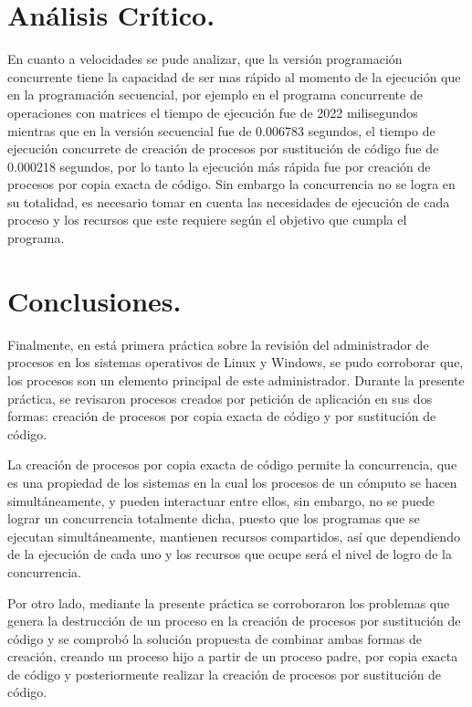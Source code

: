 \documentclass[12pt]{article}
\begin{document}
\section{Análisis Crítico.}
    
En cuanto a velocidades  se pude analizar, que la versión programación concurrente tiene la capacidad de ser mas rápido al momento de la ejecución que en la programación secuencial, por ejemplo en el programa concurrente de operaciones con matrices el tiempo de ejecución fue de 2022 milisegundos mientras que en la versión secuencial fue de 0.006783 segundos, el tiempo de ejecución concurrete de creación de procesos por sustitución de código fue de 0.000218 segundos, por lo tanto la ejecución más rápida fue por creación de procesos por copia exacta de código. Sin embargo la concurrencia no se logra en su totalidad, es necesario tomar en cuenta las necesidades de ejecución de cada proceso y los recursos que este requiere según el objetivo que cumpla el programa.

\newpage
\section{Conclusiones.}

Finalmente, en está primera práctica sobre la revisión del administrador de procesos en los sistemas operativos de Linux y Windows, se pudo corroborar que, los procesos son un elemento principal de este administrador. Durante la presente práctica, se revisaron procesos creados por petición de aplicación en sus dos formas: creación de procesos por copia exacta de código y por sustitución de código. 

La creación de procesos por copia exacta de código permite la concurrencia, que es una propiedad de los sistemas en la cual los procesos de un cómputo se hacen simultáneamente, y pueden interactuar entre ellos, sin embargo, no se puede lograr un concurrencia totalmente dicha, puesto que los programas que se ejecutan simultáneamente, mantienen recursos compartidos, así que dependiendo de la ejecución de cada uno y los recursos que ocupe será el nivel de logro de la concurrencia. 

Por otro lado, mediante la presente práctica se corroboraron los problemas que genera la destrucción de un proceso en la creación de procesos por sustitución de código y se comprobó la solución propuesta de combinar ambas formas de creación, creando un proceso hijo a partir de un proceso padre, por copia exacta de código y posteriormente realizar la creación de procesos por sustitución de código.
\end{document}
